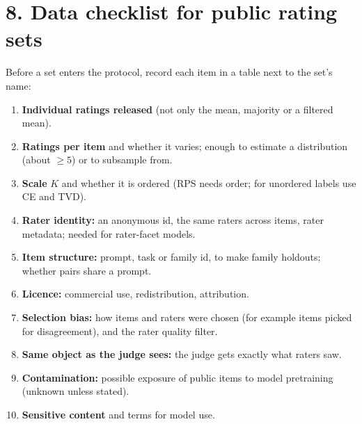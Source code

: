 \documentclass[10.5pt]{article}
\begin{document}
\section*{8. Data checklist for public rating sets}
Before a set enters the protocol, record each item in a table next to the set's name:
\begin{enumerate}
\item \textbf{Individual ratings released} (not only the mean, majority or a filtered mean).
\item \textbf{Ratings per item} and whether it varies; enough to estimate a distribution (about $\ge5$) or to subsample from.
\item \textbf{Scale} $K$ and whether it is ordered (RPS needs order; for unordered labels use CE and TVD).
\item \textbf{Rater identity:} an anonymous id, the same raters across items, rater metadata; needed for rater-facet models.
\item \textbf{Item structure:} prompt, task or family id, to make family holdouts; whether pairs share a prompt.
\item \textbf{Licence:} commercial use, redistribution, attribution.
\item \textbf{Selection bias:} how items and raters were chosen (for example items picked for disagreement), and the rater quality filter.
\item \textbf{Same object as the judge sees:} the judge gets exactly what raters saw.
\item \textbf{Contamination:} possible exposure of public items to model pretraining (unknown unless stated).
\item \textbf{Sensitive content} and terms for model use.
\end{enumerate}
\end{document}
